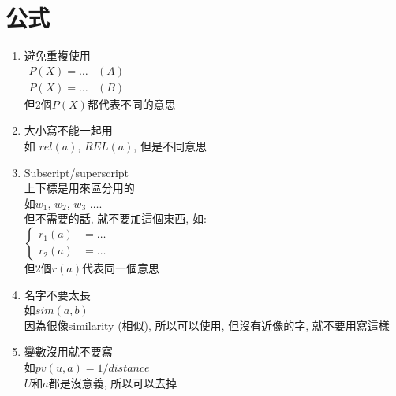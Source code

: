 \section{公式}

\begin{enumerate}
  \item
  {
    避免重複使用\\
    $
      \begin{array}{ll}
            P(X) = \ldots & (A)\\
            P(X) = \ldots & (B)
      \end{array}
    $\\
    但2個$ P(X) $都代表不同的意思
  } %

  \item
  {
    大小寫不能一起用\\
    如 $ rel (a) $, $ REL(a) $, 但是不同意思
  } %

  \item
  {
    Subscript/superscript\\
    上下標是用來區分用的\\
    如$ w_{1} $, $ w_{2} $, $ w_{3} $ $ \ldots $.\\

    但不需要的話, 就不要加這個東西, 如:\\
    $
      \left\{
        \begin{array}{ll}
          r_{1}(a) & = \ldots\\
          r_{2}(a) & = \ldots 
      	\end{array}
      \right.
    $\\
    但2個$ r(a) $代表同一個意思
  } %

  \item
  {
    名字不要太長\\
    如$ sim(a,b) $\\
    因為很像similarity (相似), 所以可以使用, 但沒有近像的字, 就不要用寫這樣
  } %

  \item
  {
    變數沒用就不要寫\\
    如$ pv(u,a) = 1 / distance $\\
    $U$和$a$都是沒意義, 所以可以去掉
  } %
\end{enumerate}

\EndChapter
